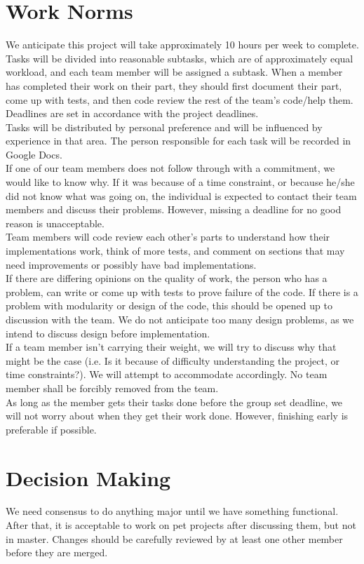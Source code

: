 \documentclass{amsart}
\begin{document}
\section{Work Norms}
We anticipate this project will take approximately 10 hours per week to complete.   
\newline
\\Tasks will be divided into reasonable subtasks, which are of approximately equal workload, and each team member will be assigned a subtask.  When a member has completed their work on their part, they should first document their part, come up with tests, and then code review the rest of the team's code/help them.  
\newline
\\Deadlines are set in accordance with the project deadlines. 
\newline
\\Tasks will be distributed by personal preference and will be influenced by experience in that area.  The person responsible for each task will be recorded in Google Docs.  
\newline
\\If one of our team members does not follow through with a commitment, we would like to know why.  If it was because of a time constraint, or because he/she did not know what was going on, the individual is expected to contact their team members and discuss their problems.  However, missing a deadline for no good reason is unacceptable. 
\newline
\\Team members will code review each other's parts to understand how their implementations work, think of more tests, and comment on sections that may need improvements or possibly have bad implementations.  
\newline
\\If there are differing opinions on the quality of work, the person who has a problem, can write or come up with tests to prove failure of the code.  If there is a problem with modularity or design of the code, this should be opened up to discussion with the team.  We do not anticipate too many design problems, as we intend to discuss design before implementation.  
\newline
\\If a team member isn't carrying their weight, we will try to discuss why that might be the case (i.e. Is it because of difficulty understanding the project, or time constraints?).  We will attempt to accommodate accordingly.  No team member shall be forcibly removed from the team.  
\newline
\\As long as the member gets their tasks done before the group set deadline, we will not worry about when they get their work done.  However, finishing early is preferable if possible.  
\section{Decision Making}

We need consensus to do anything major until we have something functional. After that, it is acceptable to work on pet projects after discussing them, but not in master. Changes should be carefully reviewed by at least one other member before they are merged.
\end{document}
